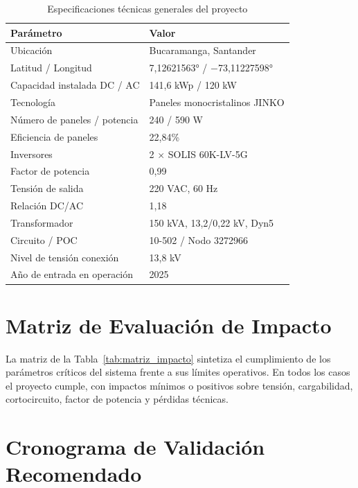 \begin{table}[H]
    \centering
    \caption{Especificaciones técnicas generales del proyecto}
    \label{tab:espec_resumen}
    \begin{tabular}{ll}
    \toprule
    \textbf{Parámetro} & \textbf{Valor} \\
    \midrule
    Ubicación & Bucaramanga, Santander \\
    Latitud / Longitud & 7,12621563° / $-$73,11227598° \\
    Capacidad instalada DC / AC & 141,6 kWp / 120 kW \\
    Tecnología & Paneles monocristalinos JINKO \\
    Número de paneles / potencia & 240 / 590 W \\
    Eficiencia de paneles & 22,84\% \\
    Inversores & 2 $\times$ SOLIS 60K-LV-5G \\
    Factor de potencia & 0,99 \\
    Tensión de salida & 220 VAC, 60 Hz \\
    Relación DC/AC & 1,18 \\
    Transformador & 150 kVA, 13,2/0,22 kV, Dyn5 \\
    Circuito / POC & 10-502 / Nodo 3272966 \\
    Nivel de tensión conexión & 13,8 kV \\
    Año de entrada en operación & 2025 \\
    \bottomrule
    \end{tabular}
\end{table}

\section{Matriz de Evaluación de Impacto}

La matriz de la Tabla~\ref{tab:matriz_impacto} sintetiza el cumplimiento de los parámetros críticos del sistema frente a sus límites operativos. En todos los casos el proyecto cumple, con impactos mínimos o positivos sobre tensión, cargabilidad, cortocircuito, factor de potencia y pérdidas técnicas.

\begin{table}[H]
    \centering
    \caption{Evaluación de impacto en parámetros del sistema}
    \label{tab:matriz_impacto}
    
\end{table}

\section{Cronograma de Validación Recomendado}

